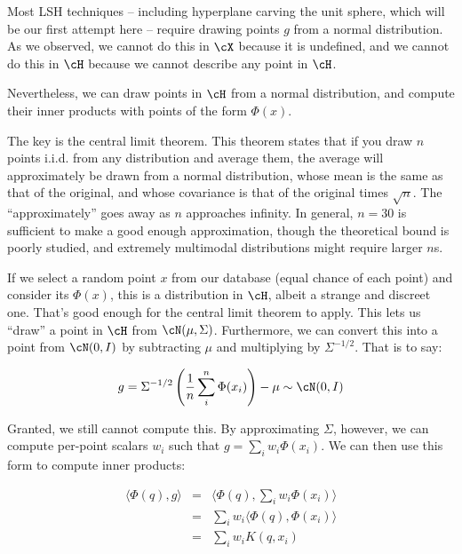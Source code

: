 \documentclass[twoside,11pt]{homework}
\begin{document}
\begin{multicols}{2}
Most LSH techniques -- including hyperplane carving the unit sphere,
which will be our first attempt here -- require drawing points $g$ from a
normal distribution.  As we observed, we cannot do this in $\cX$
because it is undefined, and we cannot do this in $\cH$ because we
cannot describe any point in $\cH$.

Nevertheless, we can draw points in $\cH$ from a normal distribution,
and compute their inner products with points of the form $\Phi(x)$.

The key is the central limit theorem.  This theorem states that if you
draw $n$ points i.i.d. from any distribution and average
them, the average will approximately be drawn from a normal
distribution, whose mean is the same as that of the original, and
whose covariance is that of the original times $\sqrt{n}$.  The
``approximately'' goes away as $n$ approaches infinity.  In general,
$n=30$ is sufficient to make a good enough approximation, though the
theoretical bound is poorly studied, and extremely multimodal
distributions might require larger $n$s.

If we select a random point $x$ from our database (equal chance of
each point) and consider its $\Phi(x)$, this is a distribution in
$\cH$, albeit a strange and discreet one.  That's good enough for the
central limit theorem to apply.  This lets us ``draw'' a point in
$\cH$ from $\cN(\mu,\Sigma)$.  Furthermore, we can convert this into a
point from $\cN(0,I)$ by subtracting $\mu$ and multiplying by
$\Sigma^{-1/2}$.  That is to say:

\begin{equation*}
  g = \Sigma^{-1/2}\left(\frac{1}{n}\sum_i^n \Phi(x_i) \right) - \mu  \sim \cN(0,I)
\end{equation*}

Granted, we still cannot compute this.  By approximating $\Sigma$,
however, we can compute per-point scalars $w_i$ such that $g=\sum_i
w_i\Phi(x_i)$.  We can then use this form to compute
inner products:

\begin{eqnarray*}
  \langle \Phi(q), g \rangle
  & = & \langle \Phi(q), \sum_i w_i\Phi(x_i) \rangle \\
  & = & \sum_i w_i \langle \Phi(q), \Phi(x_i) \rangle \\
  & = & \sum_i w_i K(q, x_i) \\
\end{eqnarray*}



\end{multicols}
\end{document}
